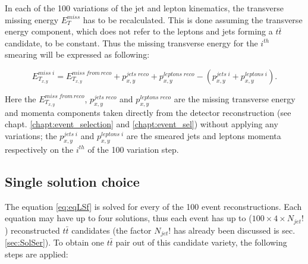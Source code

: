 In each of the 100 variations of the jet and lepton kinematics, the transverse missing energy $E_{T}^{miss}$ has to be recalculated. This is done
assuming the transverse energy component, which does not refer to the leptons and jets forming a $t\bar{t}$ candidate, to be constant. Thus the
missing transverse energy for the $i^{th}$ smearing will be expressed as following:

\begin{equation}\label{eq:weigh_av}
 E^{miss\;i}_{T_{x,y}} = E^{miss \; from \, reco}_{T_{x,y}} + p^{jets \; reco}_{x,y} + p^{leptons\;reco}_{x,y} - (p^{jets\;i}_{x,y} + p^{leptons\;i}_{x,y}).
\end{equation}

Here the $E^{miss \; from \, reco}_{T_{x,y}}$, $p^{jets \; reco}_{x,y}$ and $p^{leptons\;reco}_{x,y}$ are the missing transverse energy and momenta
components taken directly from the detector reconstruction (see chapt. \ref{chapt:event_selection} and \ref{chapt:event_sel}) without applying any 
variations; the $p^{jets\;i}_{x,y}$ and $p^{leptons\;i}_{x,y}$ are the smeared jets and leptons momenta respectively on the $i^{th}$ of the 100 
variation step.

\subsection{Single solution choice}

The equation \ref{eq:eqLSf} is solved for every of the 100 event reconstructions. Each equation may have up to four solutions, thus each event
has up to ($100 \times 4 \times N_{jet}!$) reconstructed $t\bar{t}$ candidates (the factor $N_{jet}!$ has already been discussed is sec. \ref{sec:SolSer}). 
To obtain one $t\bar{t}$ pair out of this candidate variety, the following steps are applied:

